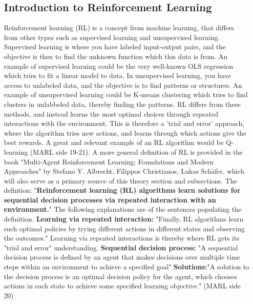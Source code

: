 \documentclass{article}
\begin{document}
\subsection{Introduction to Reinforcement Learning}
Reinforcement learning (RL) is a concept from machine learning, that differs from other types such as supervised learning and unsupervised learning.
Supervised learning is where you have labeled input-output pairs, and the objective is then to find the unknown function which this data is from. An example of supervised learning could be the very well-known OLS regression which tries to fit a linear model to data. In unsupervised learning, you have access to unlabeled data, and the objective is to find patterns or structures. An example of unsupervised learning could be K-means clustering which tries to find clusters in unlabbeled data, thereby finding the patterns. RL differs from these methods, and instead learns the most optimal choices through repeated interactions with the environment. This is therefore a 'trial and error' approach, where the algorithm tries new actions, and learns through which actions give the best rewards. A great and relevant example of an RL algorithm would be Q-learning (MARL side 19-21). 
\newline 
\newline
A more general definition of RL is provided in the book "Multi-Agent Reinforcement Learning:
Foundations and Modern Approaches" by Stefano V. Albrecht,  Filippos Christianos,  Lukas Schäfer, which will also serve as a primary source of this theory section and subsections. The defintion: 
"\textbf{Reinforcement learning (RL) algorithms learn solutions for sequential
decision processes via repeated interaction with an environment.}"
The following explanations are of the sentences populating the definition.
\textbf{Learning via repeated interaction:} "Finally, RL algorithms learn such optimal policies by trying different actions in different states and observing the outcomes."
Learning via repeated interactions is thereby where RL gets its "trial and error" understanding.
\textbf{Sequential decision process:
}"A sequential decision process is defined by an agent that makes decisions
over multiple time steps within an environment to achieve a specified goal" 
\textbf{Solutions:}"A solution to the decision process is an optimal decision policy for the agent,
which chooses actions in each state to achieve some specified learning objective." 
\newline
(MARL side 20)
\newline
\end{document}
